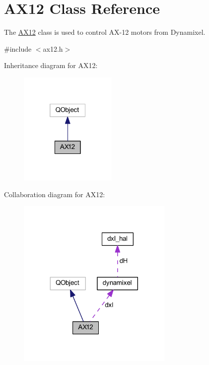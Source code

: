 \hypertarget{class_a_x12}{}\section{A\+X12 Class Reference}
\label{class_a_x12}


The \hyperlink{class_a_x12}{A\+X12} class is used to control A\+X-\/12 motors from Dynamixel.  




{\ttfamily \#include $<$ax12.\+h$>$}



Inheritance diagram for A\+X12\+:\nopagebreak
\begin{figure}[H]
\begin{center}
\leavevmode
\includegraphics[width=133pt]{db/dc9/class_a_x12__inherit__graph}
\end{center}
\end{figure}


Collaboration diagram for A\+X12\+:\nopagebreak
\begin{figure}[H]
\begin{center}
\leavevmode
\includegraphics[width=212pt]{d4/dc1/class_a_x12__coll__graph}
\end{center}
\end{figure}
